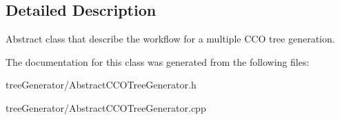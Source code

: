 \subsection{Detailed Description}
Abstract class that describe the workflow for a multiple C\+CO tree generation. 

The documentation for this class was generated from the following files\+:\begin{DoxyCompactItemize}
\item 
tree\+Generator/Abstract\+C\+C\+O\+Tree\+Generator.\+h\item 
tree\+Generator/Abstract\+C\+C\+O\+Tree\+Generator.\+cpp\end{DoxyCompactItemize}
